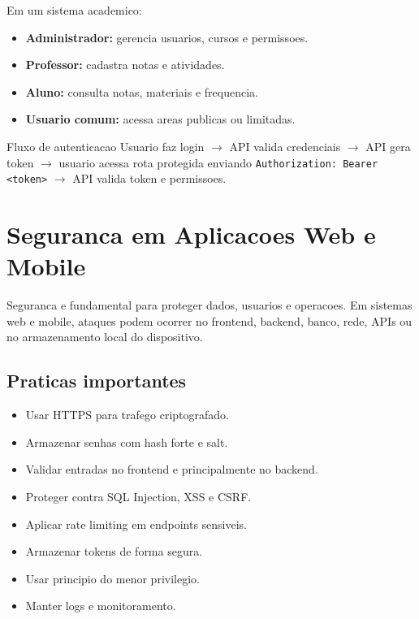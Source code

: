 \documentclass[12pt,a4paper]{article}
\begin{document}
Em um sistema academico:

\begin{itemize}
  \item \textbf{Administrador:} gerencia usuarios, cursos e permissoes.
  \item \textbf{Professor:} cadastra notas e atividades.
  \item \textbf{Aluno:} consulta notas, materiais e frequencia.
  \item \textbf{Usuario comum:} acessa areas publicas ou limitadas.
\end{itemize}

\begin{conceito}{Fluxo de autenticacao}
Usuario faz login $\rightarrow$ API valida credenciais $\rightarrow$ API gera token $\rightarrow$ usuario acessa rota protegida enviando \texttt{Authorization: Bearer <token>} $\rightarrow$ API valida token e permissoes.
\end{conceito}

\section{Seguranca em Aplicacoes Web e Mobile}

Seguranca e fundamental para proteger dados, usuarios e operacoes. Em sistemas web e mobile, ataques podem ocorrer no frontend, backend, banco, rede, APIs ou no armazenamento local do dispositivo.

\subsection{Praticas importantes}

\begin{itemize}
  \item Usar HTTPS para trafego criptografado.
  \item Armazenar senhas com hash forte e salt.
  \item Validar entradas no frontend e principalmente no backend.
  \item Proteger contra SQL Injection, XSS e CSRF.
  \item Aplicar rate limiting em endpoints sensiveis.
  \item Armazenar tokens de forma segura.
  \item Usar principio do menor privilegio.
  \item Manter logs e monitoramento.
\end{itemize}
\end{document}
